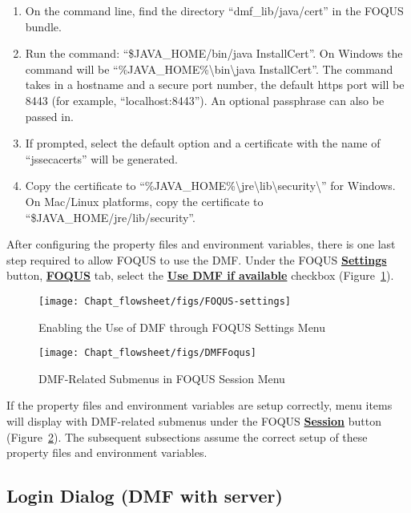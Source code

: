 \begin{enumerate}
\item On the command line, find the directory ``dmf\_lib/java/cert'' in the FOQUS bundle.
\item Run the command: ``\$JAVA\_HOME/bin/java InstallCert''. On Windows the command will be ``\%JAVA\_HOME\%\textbackslash bin\textbackslash java InstallCert''.
The command takes in a hostname and a secure port number, the default https port will be 8443 (for example, ``localhost:8443''). An optional passphrase can also be passed in.
\item If prompted, select the default option and a certificate with the name of ``jssecacerts'' will be generated.
\item Copy the certificate to ``\%JAVA\_HOME\%\textbackslash jre\textbackslash lib\textbackslash security\textbackslash'' for Windows. On Mac/Linux platforms, copy the certificate to
``\$JAVA\_HOME/jre/lib/security''.
\end{enumerate}

After configuring the property files and environment variables, there is one last step required to allow FOQUS to use the DMF.
Under the FOQUS \textbf{\underline{Settings}} button, \textbf{\underline{FOQUS}} tab, select the \textbf{\underline{Use DMF if available}} checkbox (Figure~\ref{fig:foqus-dmf-settings}).

\begin{figure}[H]
  \centering
  \texttt{[image: Chapt\_flowsheet/figs/FOQUS-settings]}
  \caption{Enabling the Use of DMF through FOQUS Settings Menu}
  \label{fig:foqus-dmf-settings}
\end{figure}

\begin{figure}[H]
  \centering
  \texttt{[image: Chapt\_flowsheet/figs/DMFFoqus]}
  \caption{DMF-Related Submenus in FOQUS Session Menu}
  \label{fig:foqus-dmf-menu}
\end{figure}


If the property files and environment variables are setup correctly, menu items will display with
DMF-related submenus under the FOQUS \textbf{\underline{Session}} button (Figure~\ref{fig:foqus-dmf-menu}).
The subsequent subsections assume the correct setup of these property files and environment variables.

\subsection{Login Dialog (DMF with server)}
\label{login-dialog}

